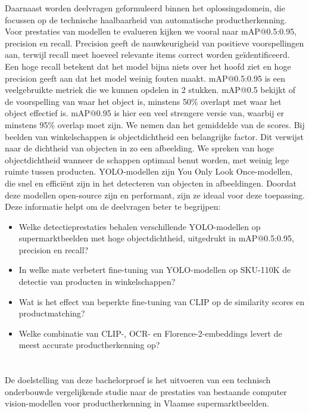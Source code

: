 Daarnaast worden deelvragen geformuleerd binnen het oplossingsdomein, die focussen op de technische haalbaarheid van automatische productherkenning.
Voor prestaties van modellen te evalueren kijken we vooral naar mAP@0.5:0.95, precision en recall. Precision geeft de nauwkeurigheid van positieve voorspellingen aan, terwijl recall meet hoeveel relevante items correct worden geïdentificeerd. Een hoge recall betekent dat het model bijna niets over het hoofd ziet en hoge precision geeft aan dat het model weinig fouten maakt.
mAP@0.5:0.95 is een veelgebruikte metriek die we kunnen opdelen in 2 stukken. mAP@0.5 bekijkt of de voorspelling van waar het object is, minstens 50\% overlapt met waar het object effectief is. mAP@0.95 is hier een veel strengere versie van, waarbij er minstens 95\% overlap moet zijn. We nemen dan het gemiddelde van de scores. 
Bij beelden van winkelschappen is objectdichtheid een belangrijke factor. Dit verwijst naar de dichtheid van objecten in zo een afbeelding. We spreken van hoge objectdichtheid wanneer de schappen optimaal benut worden, met weinig lege ruimte tussen producten. 
YOLO-modellen zijn You Only Look Once-modellen, die snel en efficiënt zijn in het detecteren van objecten in afbeeldingen. Doordat deze modellen open-source zijn en performant, zijn ze ideaal voor deze toepassing. Deze informatie helpt om de deelvragen beter te begrijpen:
\begin{itemize}
    \item Welke detectieprestaties behalen verschillende YOLO-modellen op supermarktbeelden met hoge objectdichtheid, uitgedrukt in mAP@0.5:0.95, precision en recall?
    \item In welke mate verbetert fine-tuning van YOLO-modellen op SKU-110K de detectie van producten in winkelschappen?
    \item Wat is het effect van beperkte fine-tuning van CLIP op de similarity scores en productmatching?
    \item Welke combinatie van CLIP-, OCR- en Florence-2-embeddings levert de meest accurate productherkenning op?
\end{itemize}


\section{}%
\label{sec:onderzoeksdoelstelling}

De doelstelling van deze bachelorproef is het uitvoeren van een technisch onderbouwde vergelijkende studie naar de prestaties van bestaande computer vision-modellen voor productherkenning in Vlaamse supermarktbeelden.

